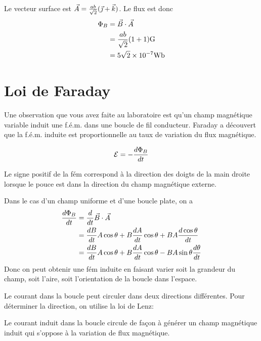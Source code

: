 \begin{reponsebox}
  Le vecteur surface est $\vec{A} = \frac{ab}{\sqrt{2}}(\vec{\jmath} + \vec{k})$. Le
  flux est donc
  \begin{align*}
    \Phi_B &= \vB \cdot \vec{A}  \\
           &= \frac{ab}{\sqrt{2}}  (1 + 1) \si{G}  \\
           &= 5 \sqrt{2} \times 10^{-7} \si{\weber}
  \end{align*}
\end{reponsebox}




\section{Loi de Faraday}


Une observation que vous avez faite au laboratoire est qu'un champ magnétique
variable induit une f.é.m. dans une boucle de fil conducteur. Faraday a
découvert que la f.é.m. induite est proportionnelle au taux de variation du
flux magnétique.
\begin{fondamentalbox}
  $$\mathcal{E} = -\frac{d\Phi_B}{dt}$$
\end{fondamentalbox}
Le signe positif de la fém correspond à la direction des doigts de la main
droite lorsque le pouce est dans la direction du champ magnétique externe.

Dans le cas d'un champ uniforme et d'une boucle plate, on a
\begin{align*}
  \frac{d\Phi_B}{dt} &= \frac{d}{dt} \vec{B} \cdot \vec{A} \\
                     &= \frac{dB}{dt} A\cos\theta + B \frac{dA}{dt} \cos\theta
                     + BA \frac{d\cos\theta}{dt} \\
                     &= \frac{dB}{dt} A\cos\theta + B \frac{dA}{dt} \cos\theta
                     - BA \sin\theta \frac{d\theta}{dt}
\end{align*}
Donc on peut obtenir une fém induite en faisant varier soit la grandeur du
champ, soit l'aire, soit l'orientation de la boucle dans l'espace.

Le courant dans la boucle peut circuler dans deux directions différentes. Pour
déterminer la direction, on utilise la loi de Lenz:

\begin{fondamentalbox}
  Le courant induit dans la boucle circule de façon à générer un champ
  magnétique induit qui s'oppose à la variation de flux magnétique.
\end{fondamentalbox}


